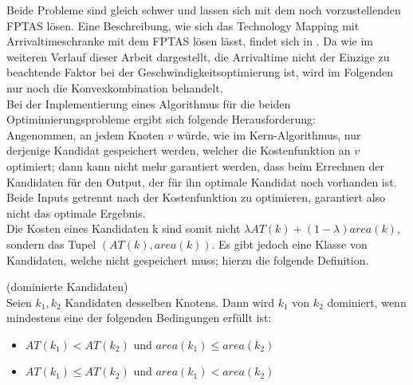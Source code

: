 \documentclass[11pt, a4paper, german]{article}
\newcommand{\TM}{Technology  Mapping }
\begin{document}
Beide Probleme sind gleich schwer und lassen sich mit dem noch vorzustellenden FPTAS lösen. Eine Beschreibung, wie sich das \TM mit Arrivaltimeschranke mit dem FPTAS lösen lässt, findet sich in \cite{Elbert}.  Da wie im weiteren Verlauf dieser Arbeit dargestellt, die Arrivaltime nicht der Einzige zu beachtende Faktor bei der Geschwindigkeitsoptimierung ist, wird im Folgenden nur noch die Konvexkombination behandelt.\\


Bei der Implementierung eines Algorithmus für die beiden Optimimierungsprobleme ergibt sich folgende Herausforderung:\\

Angenommen, an jedem Knoten $v$ würde, wie im Kern-Algorithmus, nur derjenige Kandidat gespeichert werden, welcher die Kostenfunktion an $v$ optimiert; dann kann nicht mehr garantiert werden, dass beim Errechnen der Kandidaten für den Output, der für ihn optimale Kandidat noch vorhanden ist. Beide Inputs getrennt nach der Kostenfunktion zu optimieren, garantiert also nicht das optimale Ergebnis.\\

Die Kosten eines Kandidaten k sind somit nicht $\lambda AT(k) +(1-\lambda )area(k)$,  sondern das Tupel $(AT(k), area(k))$.
Es gibt jedoch eine Klasse von Kandidaten, welche nicht gespeichert muss; hierzu die folgende Definition.\\

\begin{definition}{(dominierte Kandidaten)}\\
	Seien $k_1, k_2$ Kandidaten desselben Knotens. Dann wird $k_1$ von $k_2$ dominiert, wenn mindestens eine der folgenden Bedingungen erfüllt ist:
	\begin{itemize}
	\item $AT(k_1) < AT(k_2) \text { und  }area(k_1) \leq area(k_2)$
	\item $	AT(k_1) \leq AT(k_2) \text{ und } area(k_1) < area(k_2)$	
	\end{itemize}
\end{definition}
\end{document}
